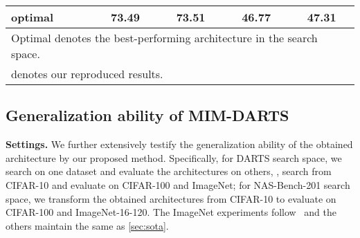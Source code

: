 \documentclass[10pt,twocolumn,letterpaper]{article}
\newcommand{\mypara}[1]{\vspace{1mm}\noindent\textbf{#1}}
\begin{document}
\begin{table}
\begin{center}
{\begin{tabular}{lcccc}
          \midrule
          optimal                                                               & 73.49               & 73.51               & 46.77               & 47.31               \\ 
          \bottomrule
          \multicolumn{5}{l}{ \small
          Optimal denotes the best-performing architecture in the search space.} \\
           \multicolumn{5}{l}{ \small  denotes our reproduced results. }
        \end{tabular}      }
        \label{tab:nas201_transform}
      \end{center}
      \vspace{-4pt}
\end{table} 
\subsection{Generalization ability of MIM-DARTS}
\vspace{-4pt}
\label{sec:generalization}
\mypara{Settings.}
We further extensively testify the generalization ability of the obtained architecture by our proposed method.
Specifically, for DARTS search space, we search on one dataset and evaluate the architectures on others, \eg, search from CIFAR-10 and evaluate on CIFAR-100 and ImageNet;
for NAS-Bench-201 search space, we transform the obtained architectures from CIFAR-10 to evaluate on CIFAR-100 and ImageNet-16-120.
The ImageNet experiments follow~\cite{Zhang_2021_rlnas} and the others maintain the same as \cref{sec:sota}.
\end{document}
